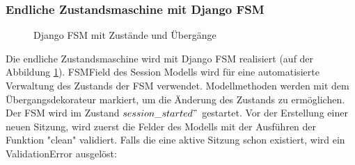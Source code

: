 \subsubsection{Endliche Zustandsmaschine mit Django FSM}
\label{sec:server:fsm:fsm}
\begin{figure}
	\centering
	\caption{Django FSM mit Zustände und Übergänge}
	\label{fig:django_fsm_trans}
\end{figure}
Die endliche Zustandsmaschine wird mit Django FSM realisiert (auf der Abbildung \ref{fig:django_fsm_trans}). FSMField des Session Modells wird für eine automatisierte Verwaltung des Zustands der FSM verwendet. Modellmethoden werden mit dem Übergangsdekorateur markiert, um die Änderung des Zustands zu ermöglichen. Der FSM wird im Zustand $session\_started"$ gestartet. Vor der Erstellung einer neuen Sitzung, wird zuerst die Felder des Modells mit der Ausführen der Funktion "clean" validiert. Falls die eine aktive Sitzung schon existiert, wird ein ValidationError ausgelöst:

